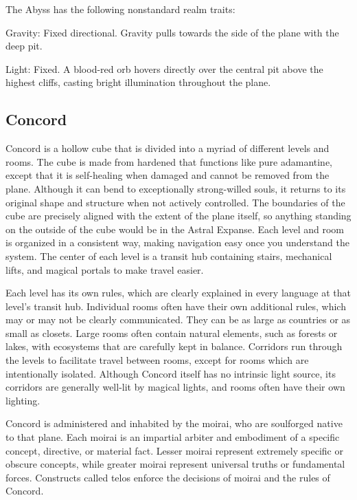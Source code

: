       The Abyss has the following nonstandard realm traits:
      \begin{raggeditemize}
        \item Gravity: Fixed directional. Gravity pulls towards the side of the plane with the deep pit.
        \item Light: Fixed. A blood-red orb hovers directly over the central pit above the highest cliffs, casting bright illumination throughout the plane.
      \end{raggeditemize}

    \subsection{Concord}
      Concord is a hollow cube that is divided into a myriad of different levels and rooms.
      The cube is made from hardened  that functions like pure adamantine, except that it is self-healing when damaged and cannot be removed from the plane.
      Although it can bend to exceptionally strong-willed souls, it returns to its original shape and structure when not actively controlled.
      The boundaries of the cube are precisely aligned with the extent of the plane itself, so anything standing on the outside of the cube would be in the Astral Expanse.
      Each level and room is organized in a consistent way, making navigation easy once you understand the system.
      The center of each level is a transit hub containing stairs, mechanical lifts, and magical portals to make travel easier.

      Each level has its own rules, which are clearly explained in every language at that level's transit hub.
      Individual rooms often have their own additional rules, which may or may not be clearly communicated.
      They can be as large as countries or as small as closets.
      Large rooms often contain natural elements, such as forests or lakes, with ecosystems that are carefully kept in balance.
      Corridors run through the levels to facilitate travel between rooms, except for rooms which are intentionally isolated.
      Although Concord itself has no intrinsic light source, its corridors are generally well-lit by magical lights, and rooms often have their own lighting.

      Concord is administered and inhabited by the moirai, who are soulforged native to that plane.
      Each moirai is an impartial arbiter and embodiment of a specific concept, directive, or material fact.
      Lesser moirai represent extremely specific or obscure concepts, while greater moirai represent universal truths or fundamental forces.
      Constructs called telos enforce the decisions of moirai and the rules of Concord.

